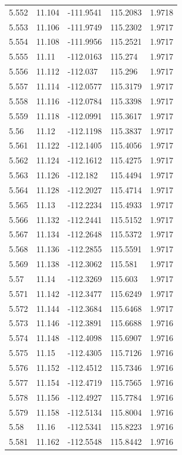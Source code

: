 \begin{tabular}{lllll}
5.552 & 11.104 & -111.9541 & 115.2083 & 1.9718 \\
5.553 & 11.106 & -111.9749 & 115.2302 & 1.9717 \\
5.554 & 11.108 & -111.9956 & 115.2521 & 1.9717 \\
5.555 & 11.11 & -112.0163 & 115.274 & 1.9717 \\
5.556 & 11.112 & -112.037 & 115.296 & 1.9717 \\
5.557 & 11.114 & -112.0577 & 115.3179 & 1.9717 \\
5.558 & 11.116 & -112.0784 & 115.3398 & 1.9717 \\
5.559 & 11.118 & -112.0991 & 115.3617 & 1.9717 \\
5.56 & 11.12 & -112.1198 & 115.3837 & 1.9717 \\
5.561 & 11.122 & -112.1405 & 115.4056 & 1.9717 \\
5.562 & 11.124 & -112.1612 & 115.4275 & 1.9717 \\
5.563 & 11.126 & -112.182 & 115.4494 & 1.9717 \\
5.564 & 11.128 & -112.2027 & 115.4714 & 1.9717 \\
5.565 & 11.13 & -112.2234 & 115.4933 & 1.9717 \\
5.566 & 11.132 & -112.2441 & 115.5152 & 1.9717 \\
5.567 & 11.134 & -112.2648 & 115.5372 & 1.9717 \\
5.568 & 11.136 & -112.2855 & 115.5591 & 1.9717 \\
5.569 & 11.138 & -112.3062 & 115.581 & 1.9717 \\
5.57 & 11.14 & -112.3269 & 115.603 & 1.9717 \\
5.571 & 11.142 & -112.3477 & 115.6249 & 1.9717 \\
5.572 & 11.144 & -112.3684 & 115.6468 & 1.9717 \\
5.573 & 11.146 & -112.3891 & 115.6688 & 1.9716 \\
5.574 & 11.148 & -112.4098 & 115.6907 & 1.9716 \\
5.575 & 11.15 & -112.4305 & 115.7126 & 1.9716 \\
5.576 & 11.152 & -112.4512 & 115.7346 & 1.9716 \\
5.577 & 11.154 & -112.4719 & 115.7565 & 1.9716 \\
5.578 & 11.156 & -112.4927 & 115.7784 & 1.9716 \\
5.579 & 11.158 & -112.5134 & 115.8004 & 1.9716 \\
5.58 & 11.16 & -112.5341 & 115.8223 & 1.9716 \\
5.581 & 11.162 & -112.5548 & 115.8442 & 1.9716 \\

\end{tabular}
